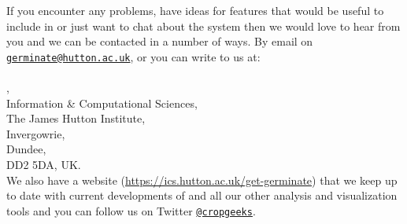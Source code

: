 If you encounter any problems, have ideas for features that would be useful to include in {\germinate} or just want to chat about the system then we would love to hear from you and we can be contacted in a number of ways. By email on \href{mailto:germinate@hutton.ac.uk}{\nolinkurl{germinate@hutton.ac.uk}}, or you can write to us at: \\
\\
{\germinate},\\ 
Information \& Computational Sciences, \\
The James Hutton Institute, \\
Invergowrie, \\
Dundee, \\
DD2 5DA, UK. \\

\noindent
We also have a website (\url{https://ics.hutton.ac.uk/get-germinate}) that we keep up to date with current developments of {\germinate} and all our other analysis and visualization tools and you can follow us on Twitter \href{https://twitter.com/cropgeeks}{\nolinkurl{@cropgeeks}}.